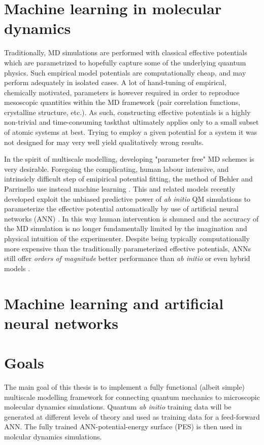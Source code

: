 \documentclass[twoside,english]{uiofysmaster}
\begin{document}
\section{Machine learning in molecular dynamics}
Traditionally, MD simulations are performed with classical effective potentials which are parametrized to hopefully capture some of the underlying quantum physics. Such empirical model potentials are computationally cheap, and may perform adequately in isolated cases. A lot of hand-tuning of empirical, chemically motivated, parameters is however required in order to reproduce mesoscopic quantities within the MD framework (pair correlation functions, crystalline structure, etc.). As such, constructing effective potentials is a highly non-trivial and time-consuming task\textemdash that ultimately applies only to a small subset of atomic systems at best. Trying to employ a given potential for a 
system it was not designed for may very well yield qualitatively wrong results. 

In the spirit of multiscale modelling, developing "parameter free" MD schemes is very desirable. Foregoing the complicating, human labour intensive, and intrinsicly difficult step of emipirical potential fitting, the method of Behler and Parrinello use instead machine learning \cite{behlerparrinello}. This and related models recently developed exploit the unbiased predictive power of \emph{ab initio} QM simulations to parameterize the effective potential automatically by use of artificial neural networks (ANN) \cite{shen}. In this way human intervention is  shunned and the accuracy of the MD simulation is no longer fundamentally limited by the imagination and physical intuition of the experimenter. Despite being typically computationally more expensive than the traditionally parameterized effective potentials, ANNs still offer \emph{orders of magnitude} better performance than \emph{ab initio} or even hybrid models \cite{ratcliff,behler}.

\section{Machine learning and artificial neural networks}



\section{Goals}
The main goal of this thesis is to implement a fully functional (albeit simple) multiscale modelling framework for connecting quantum mechanics to microscopic molecular dynamics simulations. Quantum \emph{ab initio} training data will be generated at different levels of theory and used as training data for a feed-forward ANN. The fully trained ANN-potential-energy surface (PES) is then used in molcular dynamics simulations. 
\end{document}
